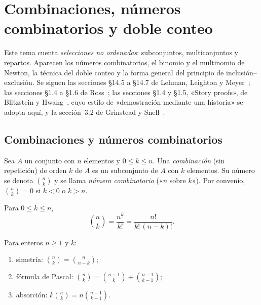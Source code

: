 \chapter{Combinaciones, números combinatorios y doble conteo}
\label{tema:2}

Este tema cuenta \emph{selecciones no ordenadas}: subconjuntos, multiconjuntos y repartos. Aparecen los números combinatorios, el binomio y el multinomio de Newton, la técnica del doble conteo y la forma general del principio de inclusión--exclusión. Se siguen las secciones §14.5 a §14.7 de Lehman, Leighton y Meyer~\cite{mcs}; las secciones §1.4 a §1.6 de Ross~\cite{ross}; las secciones §1.4 y §1.5, «Story proofs», de Blitzstein y Hwang~\cite{bh}, cuyo estilo de «demostración mediante una historia» se adopta aquí, y la sección~3.2 de Grinstead y Snell~\cite{gs}.

\section{Combinaciones y números combinatorios}

\begin{definicion}[Combinaciones]
Sea $A$ un conjunto con $n$ elementos y $0\le k\le n$. Una \emph{combinación} (sin repetición) de orden $k$ de $A$ es un subconjunto de $A$ con $k$ elementos. Su número se denota $\binom{n}{k}$ y se llama \emph{número combinatorio} («$n$ sobre $k$»). Por convenio, $\binom{n}{k}=0$ si $k<0$ o $k>n$.
\end{definicion}

\begin{teorema}\label{teo:t2-binom}
Para $0\le k\le n$,
\[
\binom{n}{k}=\frac{n^{\underline{k}}}{k!}=\frac{n!}{k!\,(n-k)!}.
\]
\end{teorema}

\begin{proposicion}\label{prop:t2-props}
Para enteros $n\ge1$ y $k$:
\begin{enumerate}
  \item simetría: $\binom{n}{k}=\binom{n}{n-k}$;
  \item fórmula de Pascal: $\binom{n}{k}=\binom{n-1}{k}+\binom{n-1}{k-1}$;
  \item absorción: $k\binom{n}{k}=n\binom{n-1}{k-1}$.
\end{enumerate}
\end{proposicion}

